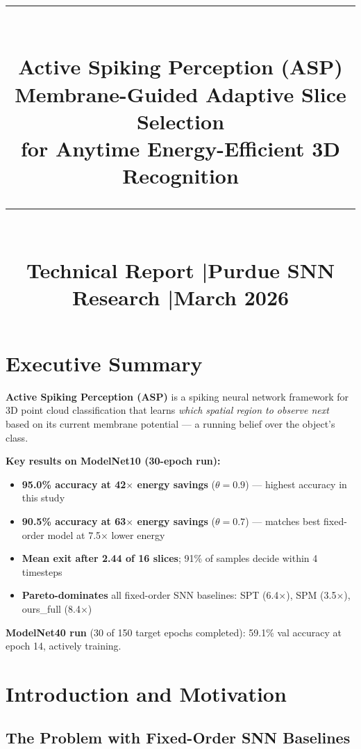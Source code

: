 \documentclass[11pt,a4paper]{article}
\title{%
  \vspace{-1.5cm}
  {\color{darkblue}\rule{\linewidth}{2pt}}\\[8pt]
  \textbf{\Large Active Spiking Perception (ASP)}\\[4pt]
  \large Membrane-Guided Adaptive Slice Selection\\
  for Anytime Energy-Efficient 3D Recognition\\[6pt]
  {\color{darkblue}\rule{\linewidth}{1pt}}\\[4pt]
  \normalsize Technical Report \quad|\quad Purdue SNN Research \quad|\quad March 2026
}
\author{}
\date{}
\begin{document}
\maketitle
\thispagestyle{fancy}
\tableofcontents
\newpage

\section{Executive Summary}

\begin{mdframed}[backgroundcolor=blue!5,linecolor=darkblue,linewidth=1pt,innertopmargin=10pt,innerbottommargin=10pt]
\textbf{Active Spiking Perception (ASP)} is a spiking neural network framework for 3D point cloud
classification that learns \emph{which spatial region to observe next} based on its current
membrane potential --- a running belief over the object's class.

\medskip
\noindent\textbf{Key results on ModelNet10 (30-epoch run):}
\begin{itemize}[nosep]
  \item \textbf{95.0\% accuracy at 42$\times$ energy savings} ($\theta = 0.9$) --- highest accuracy in this study
  \item \textbf{90.5\% accuracy at 63$\times$ energy savings} ($\theta = 0.7$) --- matches best fixed-order model at 7.5$\times$ lower energy
  \item \textbf{Mean exit after 2.44 of 16 slices}; 91\% of samples decide within 4 timesteps
  \item \textbf{Pareto-dominates} all fixed-order SNN baselines: SPT (6.4$\times$), SPM (3.5$\times$), ours\_full (8.4$\times$)
\end{itemize}

\medskip
\noindent\textbf{ModelNet40 run} (30 of 150 target epochs completed): 59.1\% val accuracy at epoch 14, actively training.
\end{mdframed}

\section{Introduction and Motivation}

\subsection{The Problem with Fixed-Order SNN Baselines}
\end{document}
